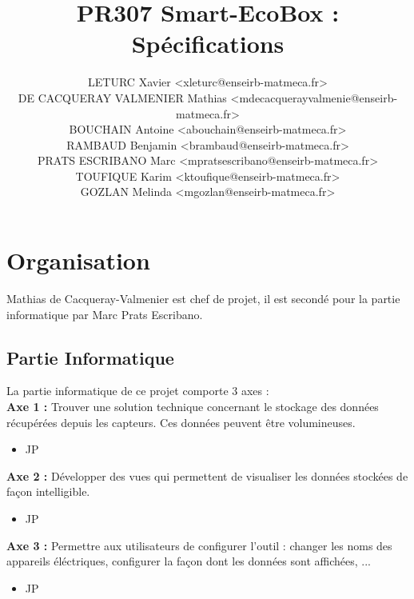 \documentclass[10pt,a4paper]{article}
\title{PR307 Smart-EcoBox : \\
Spécifications}
\author{LETURC Xavier <xleturc@enseirb-matmeca.fr> \\
DE CACQUERAY VALMENIER Mathias <mdecacquerayvalmenie@enseirb-matmeca.fr> \\
BOUCHAIN Antoine <abouchain@enseirb-matmeca.fr> \\
RAMBAUD Benjamin <brambaud@enseirb-matmeca.fr> \\
PRATS ESCRIBANO Marc <mpratsescribano@enseirb-matmeca.fr> \\
TOUFIQUE Karim <ktoufique@enseirb-matmeca.fr> \\
GOZLAN Melinda <mgozlan@enseirb-matmeca.fr> }
\begin{document}
\maketitle

\begin{figure}[ht]
\begin{center}
\end{center}
\end{figure}


\newpage

\tableofcontents

\newpage

\section{Organisation}
Mathias de Cacqueray-Valmenier est chef de projet, il est secondé pour la partie informatique par Marc Prats Escribano.
\subsection{Partie Informatique}
La partie informatique de ce projet comporte 3 axes :\\
\textbf{Axe 1 :} Trouver une solution technique concernant le stockage des données récupérées depuis les capteurs. Ces
données peuvent être volumineuses.
\begin{itemize}
\item JP
\end{itemize}
\textbf{Axe 2 :} Développer des vues qui permettent de visualiser les données stockées de façon intelligible.
\begin{itemize}
\item JP
\end{itemize}
\textbf{Axe 3 :} Permettre aux utilisateurs de configurer l’outil : changer les noms des appareils éléctriques, configurer la
façon dont les données sont affichées, ...
\begin{itemize}
\item JP
\end{itemize}
\end{document}
